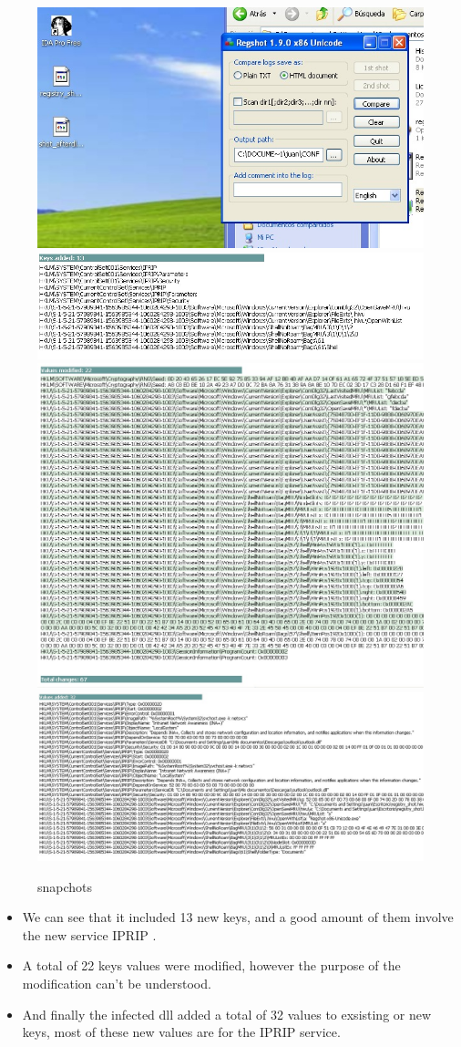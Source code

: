 \documentclass[12pt,letter]{article} %
\begin{document}
            $ $\\
            \begin{figure}[h!]
                \centering
                \includegraphics[width=0.4\linewidth]{punto5_1.jpeg}
                \includegraphics[width=0.4\linewidth]{punto5_2.jpeg}
                \\
                \includegraphics[width=0.4\linewidth]{punto5_3.jpeg}
                \includegraphics[width=0.4\linewidth]{punto5_4.jpeg}
                \caption{snapchots}
                \label{snapchots snapchots... }
            \end{figure}

            \begin{itemize}
                \item {We can see that it included 13 new keys, and a good amount of them
            involve the new service IPRIP .}
            \item {A total of 22 keys values were modified, however the purpose of the
            modification can't be understood.}
            \item {And finally the infected dll added a total of 32 values to
            exsisting or new keys, most of these new values are for the IPRIP
            service.}
            \end{itemize}
\end{document}
